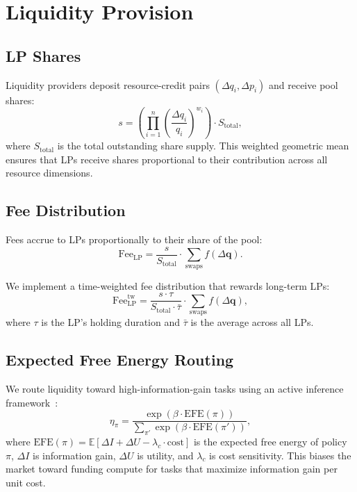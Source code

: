 \section{Liquidity Provision}

\label{sec:liquidity}

\subsection{LP Shares}

Liquidity providers deposit resource-credit pairs $(\Delta q_i, \Delta p_i)$ and receive pool shares:
\begin{equation}
s = \left(\prod_{i=1}^n \left(\frac{\Delta q_i}{q_i}\right)^{w_i}\right) \cdot S_{\text{total}},
\end{equation}
where $S_{\text{total}}$ is the total outstanding share supply. This weighted geometric mean ensures that LPs receive shares proportional to their contribution across all resource dimensions.

\subsection{Fee Distribution}

Fees accrue to LPs proportionally to their share of the pool:
\begin{equation}
\text{Fee}_{\text{LP}} = \frac{s}{S_{\text{total}}} \cdot \sum_{\text{swaps}} f(\Delta\bm{q}).
\end{equation}

We implement a time-weighted fee distribution that rewards long-term LPs:
\begin{equation}
\text{Fee}_{\text{LP}}^{\text{tw}} = \frac{s \cdot \tau}{S_{\text{total}} \cdot \bar{\tau}} \cdot \sum_{\text{swaps}} f(\Delta\bm{q}),
\end{equation}
where $\tau$ is the LP's holding duration and $\bar{\tau}$ is the average across all LPs.

\subsection{Expected Free Energy Routing}

We route liquidity toward high-information-gain tasks using an active inference framework~\cite{friston2017active}:
\begin{equation}
\eta_\pi = \frac{\exp(\beta \cdot \text{EFE}(\pi))}{\sum_{\pi'} \exp(\beta \cdot \text{EFE}(\pi'))},
\end{equation}
where $\text{EFE}(\pi) = \mathbb{E}[\Delta I + \Delta U - \lambda_c \cdot \text{cost}]$ is the expected free energy of policy $\pi$, $\Delta I$ is information gain, $\Delta U$ is utility, and $\lambda_c$ is cost sensitivity. This biases the market toward funding compute for tasks that maximize information gain per unit cost.

